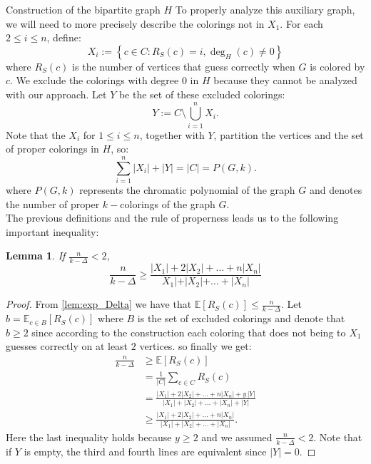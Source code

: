\documentclass[11pt, letterpaper]{article}
\theoremstyle{plain}
\theoremstyle{plain}
\newtheorem{lemma}[theorem]{Lemma}
\newcommand{\wXsum}{|X_1|+2|X_2|+\ldots +n|X_n|}
\begin{document}
\begin{section}{Construction of the bipartite graph $H$}
To properly analyze this auxiliary graph, we will need to more precisely describe the colorings not in $X_1$. For each $2 \leq i \leq n$, define:
$$X_i:= \left\{c \in C:R_{S}(c)=i, \deg_H(c) \neq 0  \right\}$$ 
where $R_{S}(c)$ is the number of vertices that guess correctly when $G$ is colored by $c$. We exclude the colorings with degree $0$ in $H$ because they cannot be analyzed with our approach.
Let $Y$ be the set of these excluded colorings:%
$$Y:=C \setminus \bigcup_{i=1}^n X_i.$$
Note that the $X_i$ for ${1 \leq i \leq n}$, together with $Y$, partition the vertices and the set of proper colorings in $H$, so: $$\sum_{i=1}^n |X_i|+|Y|=|C|= P(G,k).$$
where $P(G,k)$ represents the chromatic polynomial of the graph $G$ and denotes the number of proper $k-$colorings of the graph $G$. \\ 
The previous definitions and the rule of properness leads us to the following important inequality:
\begin{lemma}\label{lem:eq_first}
If $\frac{n}{k-\Delta} < 2$, $$\frac{n}{k-\Delta} \geq \frac{|X_{1}| + 2|X_{2}|+\ldots+n|X_{n}|}{X_{1}| + |X_{2}| + \ldots+|X_{n}|}$$
\end{lemma}
\begin{proof}
From \cref{lem:exp_Delta} we have that $\mathbb{E}[R_{S}(c)] \leq \frac{n}{k-\Delta}$. Let $b = \mathbb{E}_{c \in B}[R_{S}(c)]$ where $B$ is the set of excluded colorings and denote that $b\geq 2$ since according to the construction each coloring that does not being to $X_{1}$ guesses correctly on at least $2$ vertices. so finally we get: 
\begin{align*}
             \frac{n}{k-\Delta} &\geq \mathbb{E}[R_{S}(c)] \\
             &=\frac{1}{|C|} \sum_{c\in  C}R_{S}(c) \\
            &=\frac{ \wXsum +y\,|Y|}{|X_1|+|X_2|+\ldots +|X_n|+|Y|}  \\
             &\geq \frac{|X_1|+2|X_2|+\ldots+ n|X_n|}{|X_1|+|X_2|+\ldots+ |X_n|}.
        \end{align*}
        Here the last inequality holds because $y\geq 2$ and we assumed $\frac{n}{k-\Delta}< 2$. Note that if $Y$ is empty, the third and fourth lines are equivalent since $|Y|=0$.

\end{proof}
\end{section}
\end{document}
